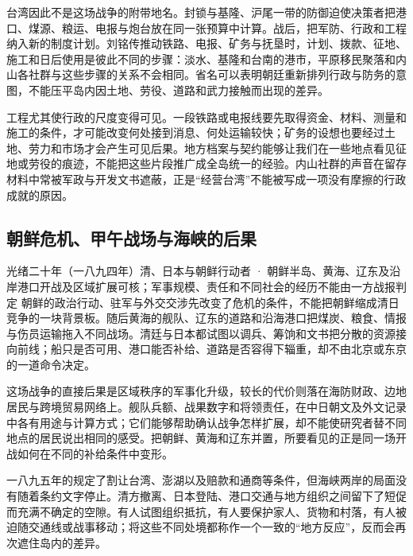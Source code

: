 台湾因此不是这场战争的附带地名。封锁与基隆、沪尾一带的防御迫使决策者把港口、煤源、粮运、电报与炮台放在同一张预算中计算。战后，把军防、行政和工程纳入新的制度计划。刘铭传推动铁路、电报、矿务与抚垦时，计划、拨款、征地、施工和日后使用是彼此不同的步骤：淡水、基隆和台南的港市，平原移民聚落和内山各社群与这些步骤的关系不会相同。省名可以表明朝廷重新排列行政与防务的意图，不能压平岛内因土地、劳役、道路和武力接触而出现的差异。

工程尤其使行政的尺度变得可见。一段铁路或电报线要先取得资金、材料、测量和施工的条件，才可能改变何处接到消息、何处运输较快；矿务的设想也要经过土地、劳力和市场才会产生可见后果。地方档案与契约能够让我们在一些地点看见征地或劳役的痕迹，不能把这些片段推广成全岛统一的经验。内山社群的声音在留存材料中常被军政与开发文书遮蔽，正是“经营台湾”不能被写成一项没有摩擦的行政成就的原因。

\subsection{朝鲜危机、甲午战场与海峡的后果}

\begin{event}{}{光绪二十年（一八九四年）}{清、日本与朝鲜行动者 · 朝鲜半岛、黄海、辽东及沿岸港口}{开战及区域扩展可核；军事规模、责任和不同社会的经历不能由一方战报判定}
朝鲜的政治行动、驻军与外交交涉先改变了危机的条件，不能把朝鲜缩成清日竞争的一块背景板。随后黄海的舰队、辽东的道路和沿海港口把煤炭、粮食、情报与伤员运输拖入不同战场。清廷与日本都试图以调兵、筹饷和文书把分散的资源接向前线；船只是否可用、港口能否补给、道路是否容得下辎重，却不由北京或东京的一道命令决定。

这场战争的直接后果是区域秩序的军事化升级，较长的代价则落在海防财政、边地居民与跨境贸易网络上。舰队兵额、战果数字和将领责任，在中日朝文及外文记录中各有用途与计算方式；它们能够帮助确认战争怎样扩展，却不能使研究者替不同地点的居民说出相同的感受。把朝鲜、黄海和辽东并置，所要看见的正是同一场开战如何在不同的补给条件中变形。
\end{event}

一八九五年的规定了割让台湾、澎湖以及赔款和通商等条件，但海峡两岸的局面没有随着条约文字停止。清方撤离、日本登陆、港口交通与地方组织之间留下了短促而充满不确定的空隙。有人试图组织抵抗，有人要保护家人、货物和村落，有人被迫随交通线或战事移动；将这些不同处境都称作一个一致的“地方反应”，反而会再次遮住岛内的差异。

